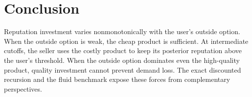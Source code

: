 \documentclass[opre]{informs3}
\begin{document}
\section{Conclusion}

Reputation investment varies nonmonotonically with the user's outside option.
When the outside option is weak, the cheap product is sufficient. At
intermediate cutoffs, the seller uses the costly product to keep its posterior
reputation above the user's threshold. When the outside option dominates even
the high-quality product, quality investment cannot prevent demand loss. The
exact discounted recursion and the fluid benchmark expose these forces from
complementary perspectives.
\end{document}
